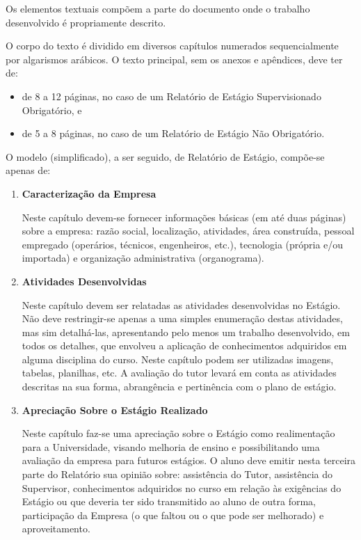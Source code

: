 \documentclass[repeatfields,xlists,xpacks,oneside,yearsonly]{ufrgscca}
\begin{document}
Os elementos textuais compõem a parte do documento onde o trabalho
desenvolvido é propriamente descrito.

O corpo do texto é dividido em diversos capítulos numerados sequencialmente
por algarismos arábicos. O texto principal, sem os anexos e apêndices, deve ter de:
\begin{itemize}
    \item de 8 a 12 páginas, no caso de um Relatório de Estágio Supervisionado Obrigatório, e
    \item de 5 a 8 páginas, no caso de um Relatório de Estágio Não Obrigatório.
\end{itemize}

O modelo (simplificado), a ser seguido, de Relatório de Estágio, compõe-se apenas de:


\begin{enumerate}[tcc]
    \item \textbf{Caracterização da Empresa}

Neste capítulo devem-se fornecer informações básicas (em até duas páginas) sobre a empresa: razão social, localização, atividades, área construída, pessoal empregado (operários, técnicos, engenheiros, etc.), tecnologia (própria e/ou importada) e organização administrativa (organograma).

    \item  \textbf{Atividades Desenvolvidas}

    Neste capítulo devem ser relatadas as atividades desenvolvidas no Estágio. Não deve restringir-se apenas a uma simples enumeração destas atividades, mas sim detalhá-las, apresentando pelo menos um trabalho desenvolvido, em todos os detalhes, que envolveu a aplicação de conhecimentos adquiridos em alguma disciplina do curso. Neste capítulo podem ser utilizadas imagens, tabelas, planilhas, etc. A avaliação do tutor levará em conta as atividades descritas na sua forma, abrangência e pertinência com o plano de estágio.

    \item \textbf{Apreciação Sobre o Estágio Realizado}

    Neste capítulo faz-se uma apreciação sobre o Estágio como realimentação para a Universidade, visando melhoria de ensino e possibilitando uma avaliação da empresa para futuros estágios. O aluno deve emitir nesta terceira parte do Relatório sua opinião sobre: assistência do Tutor, assistência do Supervisor, conhecimentos adquiridos no curso em relação às exigências do Estágio ou que deveria ter sido transmitido ao aluno de outra forma, participação da Empresa (o que faltou ou o que pode ser melhorado) e aproveitamento.
\end{enumerate}
\end{document}
